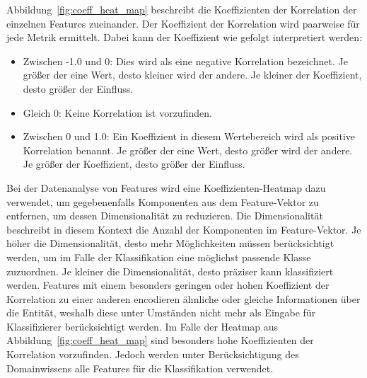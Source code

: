 \pagebreak

Abbildung~\ref{fig:coeff_heat_map} beschreibt die Koeffizienten der Korrelation der einzelnen Features zueinander. Der Koeffizient der Korrelation wird paarweise für jede Metrik ermittelt.
Dabei kann der Koeffizient wie gefolgt interpretiert werden:

\begin{itemize}
    \item Zwischen -1.0 und 0: Dies wird als eine negative Korrelation bezeichnet. Je größer der eine Wert, desto kleiner wird der andere. Je kleiner der Koeffizient, desto größer der Einfluss.
    \item Gleich 0: Keine Korrelation ist vorzufinden.
    \item Zwischen 0 und 1.0: Ein Koeffizient in diesem Wertebereich wird als positive Korrelation benannt. Je größer der eine Wert, desto größer wird der andere. Je größer der Koeffizient, desto größer der Einfluss.
\end{itemize}

Bei der Datenanalyse von Features wird eine Koeffizienten-Heatmap dazu verwendet, um gegebenenfalls Komponenten aus dem Feature-Vektor zu entfernen, um dessen Dimensionalität zu reduzieren. Die Dimensionalität beschreibt in diesem Kontext die Anzahl der Komponenten im Feature-Vektor.
Je höher die Dimensionalität, desto mehr Möglichkeiten müssen berücksichtigt werden, um im Falle der Klassifikation eine möglichst passende Klasse zuzuordnen. Je kleiner die Dimensionalität, desto präziser kann klassifiziert werden.
Features mit einem besonders geringen oder hohen Koeffizient der Korrelation zu einer anderen encodieren ähnliche oder gleiche Informationen über die Entität, weshalb diese unter Umständen nicht mehr als Eingabe für Klassifizierer berücksichtigt werden.
Im Falle der Heatmap aus Abbildung~\ref{fig:coeff_heat_map} sind besonders hohe Koeffizienten der Korrelation vorzufinden. Jedoch werden unter Berücksichtigung des Domainwissens alle Features für die Klassifikation verwendet.
  



